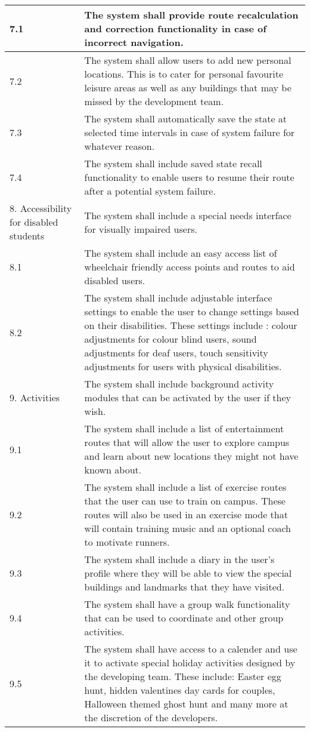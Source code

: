 \documentclass[12pt,a4paper]{report}
\begin{document}
\begin{longtable}{| p{} | p{} |}
\hline
7.1 & The system shall provide route recalculation and correction functionality in case of incorrect navigation.\\
\hline
7.2 & The system shall allow users to add new personal locations. This is to cater for personal favourite leisure areas as well as any buildings that may be missed by the development team. \\
\hline
7.3 & The system shall automatically save the state at selected time intervals in case of system failure for whatever reason.\\
\hline
7.4 & The system shall include saved state recall functionality to enable users to resume their route after a potential system failure.\\
\hline
8. Accessibility for disabled students & The system shall include a special needs interface for visually impaired users.\\
\hline
8.1 & The system shall include an easy access list of wheelchair friendly access points and routes to aid disabled users.\\
\hline
8.2 & The system shall include adjustable interface settings to enable  the user to change settings based on their disabilities. These settings include : colour adjustments for colour blind users, sound adjustments for deaf users, touch sensitivity adjustments for users with physical disabilities.\\
\hline
9. Activities & The system shall include background activity modules that can be activated by the user if they wish.\\
\hline
9.1 & The system shall include a list of entertainment routes that will allow the user to explore campus and learn about new locations they might not have known about.\\
\hline
9.2 & The system shall include a list of exercise routes that the user can use to train on campus. These routes will also be used in an exercise mode that will contain training music and an optional coach to motivate runners.\\
\hline
9.3 & The system shall include a diary in the user's profile where they will be able to view the special buildings and landmarks that they have visited.\\
\hline
9.4 & The system shall have a group walk functionality that can be used to coordinate  and other group activities.\\ 
\hline
9.5 & The system shall have access to a calender and use it to activate special holiday activities designed by the developing team. These include: Easter egg hunt, hidden valentines day cards for couples, Halloween themed ghost hunt and many more at the discretion of the developers.\\

\end{longtable}
\end{document}
